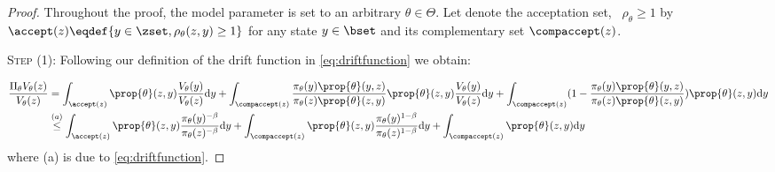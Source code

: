 \documentclass[10pt,twocolumn,letterpaper]{article}
\begin{document}
\begin{proof}
Throughout the proof, the model parameter is set to an arbitrary $\theta \in \Theta$.
Let denote the acceptation set, \ie\ $\rho_\theta \geq 1$ by $\accept(z) \eqdef \{ y \in \zset, \rho_\theta(z,y) \geq 1 \}$ for any state $y \in \bset$ and its complementary set $\compaccept(z)$.

\medskip
\noindent \textsc{Step (1): } Following our definition of the drift function in \eqref{eq:driftfunction} we obtain:

\begin{align}\label{eq:main1}
 \frac{\Pi_\theta V_\theta(z)}{V_\theta(z)} & = \int_{\accept(z)}  \prop{\theta}(z,y) \frac{V_\theta(y)}{V_\theta(z)} \textrm{d}y +  \int_{\compaccept(z)} \frac{\pi_\theta(y)\prop{\theta}(y,z)}{\pi_\theta(z)\prop{\theta}(z,y)} \prop{\theta}(z,y) \frac{V_\theta(y)}{V_\theta(z)} \textrm{d}y +  \int_{\compaccept(z)} (1 - \frac{\pi_\theta(y)\prop{\theta}(y,z)}{\pi_\theta(z)\prop{\theta}(z,y)}) \prop{\theta}(z,y)  \textrm{d}y\\
 &  \overset{(a)}{\leq} \int_{\accept(z)}  \prop{\theta}(z,y) \frac{\pi_\theta(y)^{-\beta}}{\pi_\theta(z)^{-\beta}} \textrm{d}y  + \int_{\compaccept(z)} \prop{\theta}(z,y) \frac{\pi_\theta(y)^{1-\beta}}{\pi_\theta(z)^{1-\beta}}\textrm{d}y +  \int_{\compaccept(z)} \prop{\theta}(z,y)  \textrm{d}y
\end{align}
where (a) is due to \eqref{eq:driftfunction}.


\end{proof}
\end{document}
